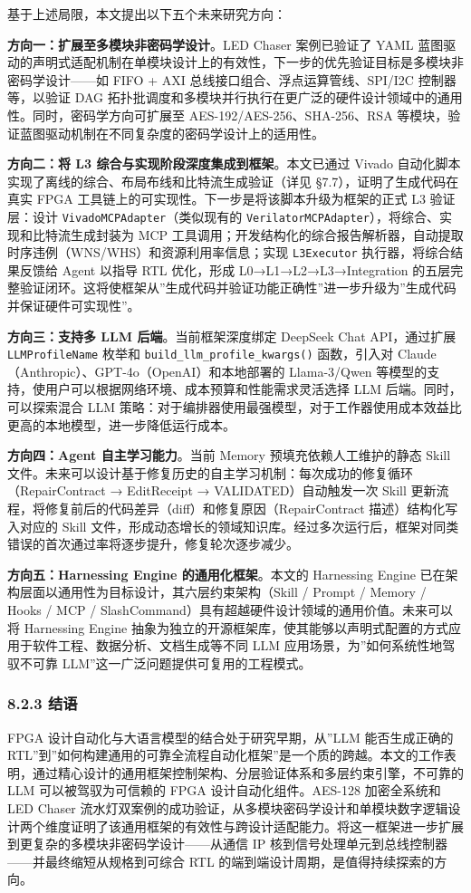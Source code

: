 基于上述局限，本文提出以下五个未来研究方向：

\textbf{方向一：扩展至多模块非密码学设计}。LED Chaser 案例已验证了 YAML
蓝图驱动的声明式适配机制在单模块设计上的有效性，下一步的优先验证目标是多模块非密码学设计------如
FIFO + AXI 总线接口组合、浮点运算管线、SPI/I2C 控制器等，以验证 DAG
拓扑批调度和多模块并行执行在更广泛的硬件设计领域中的通用性。同时，密码学方向可扩展至
AES-192/AES-256、SHA-256、RSA
等模块，验证蓝图驱动机制在不同复杂度的密码学设计上的适用性。

\textbf{方向二：将 L3 综合与实现阶段深度集成到框架}。本文已通过 Vivado
自动化脚本实现了离线的综合、布局布线和比特流生成验证（详见 §7.7），证明了生成代码在真实
FPGA 工具链上的可实现性。下一步是将该脚本升级为框架的正式 L3
验证层：设计 \texttt{VivadoMCPAdapter}（类似现有的
\texttt{VerilatorMCPAdapter}），将综合、实现和比特流生成封装为 MCP
工具调用；开发结构化的综合报告解析器，自动提取时序违例（WNS/WHS）和资源利用率信息；实现
\texttt{L3Executor}
执行器，将综合结果反馈给 Agent 以指导 RTL 优化，形成
L0→L1→L2→L3→Integration 的五层完整验证闭环。这将使框架从''生成代码并验证功能正确性''进一步升级为''生成代码并保证硬件可实现性''。

\textbf{方向三：支持多 LLM 后端}。当前框架深度绑定 DeepSeek Chat
API，通过扩展 \texttt{LLMProfileName} 枚举和
\texttt{build\_llm\_profile\_kwargs()} 函数，引入对
Claude（Anthropic）、GPT-4o（OpenAI）和本地部署的 Llama-3/Qwen
等模型的支持，使用户可以根据网络环境、成本预算和性能需求灵活选择 LLM
后端。同时，可以探索混合 LLM
策略：对于编排器使用最强模型，对于工作器使用成本效益比更高的本地模型，进一步降低运行成本。

\textbf{方向四：Agent 自主学习能力}。当前 Memory
预填充依赖人工维护的静态 Skill
文件。未来可以设计基于修复历史的自主学习机制：每次成功的修复循环（RepairContract
→ EditReceipt → VALIDATED）自动触发一次 Skill
更新流程，将修复前后的代码差异（diff）和修复原因（RepairContract
描述）结构化写入对应的 Skill
文件，形成动态增长的领域知识库。经过多次运行后，框架对同类错误的首次通过率将逐步提升，修复轮次逐步减少。

\textbf{方向五：Harnessing Engine 的通用化框架}。本文的 Harnessing
Engine 已在架构层面以通用性为目标设计，其六层约束架构（Skill / Prompt /
Memory / Hooks / MCP /
SlashCommand）具有超越硬件设计领域的通用价值。未来可以将 Harnessing
Engine
抽象为独立的开源框架库，使其能够以声明式配置的方式应用于软件工程、数据分析、文档生成等不同
LLM 应用场景，为''如何系统性地驾驭不可靠
LLM''这一广泛问题提供可复用的工程模式。

\subsubsection{8.2.3 结语}\label{ux7ed3ux8bed}

FPGA 设计自动化与大语言模型的结合处于研究早期，从''LLM 能否生成正确的
RTL''到''如何构建通用的可靠全流程自动化框架''是一个质的跨越。本文的工作表明，通过精心设计的通用框架控制架构、分层验证体系和多层约束引擎，不可靠的
LLM 可以被驾驭为可信赖的 FPGA 设计自动化组件。AES-128 加密全系统和 LED
Chaser
流水灯双案例的成功验证，从多模块密码学设计和单模块数字逻辑设计两个维度证明了该通用框架的有效性与跨设计适配能力。将这一框架进一步扩展到更复杂的多模块非密码学设计------从通信
IP 核到信号处理单元到总线控制器------并最终缩短从规格到可综合 RTL
的端到端设计周期，是值得持续探索的方向。
